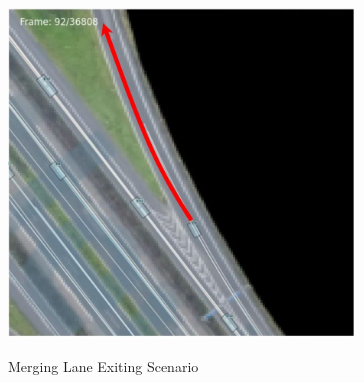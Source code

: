 \begin{frame}
\begin{figure}
\begin{minipage}[b]{0.49\linewidth}
        \centering
        \includegraphics[width=0.82\textwidth]{figures/pictures_first_part/street_with_arrow_2.jpeg}

        \centering \footnotesize Merging Lane Exiting Scenario
    \end{minipage}
  \end{figure}
\end{frame}

